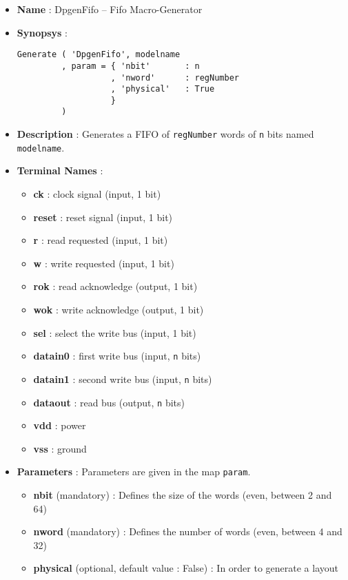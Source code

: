 \begin{itemize}
    \item \textbf{Name} : DpgenFifo -- Fifo Macro-Generator
    \item \textbf{Synopsys} :
\begin{verbatim}
Generate ( 'DpgenFifo', modelname
         , param = { 'nbit'       : n
                   , 'nword'      : regNumber
                   , 'physical'   : True                   
                   }
         )
\end{verbatim}
    \item \textbf{Description} : Generates a FIFO of \verb-regNumber- words of \verb-n- bits named \verb-modelname-.
    \item \textbf{Terminal Names} :
    \begin{itemize}
        \item \textbf{ck} : clock signal (input, 1 bit)
        \item \textbf{reset} : reset signal (input, 1 bit)
        \item \textbf{r} : read requested (input, 1 bit)
        \item \textbf{w} : write requested (input, 1 bit)
        \item \textbf{rok} : read acknowledge (output, 1 bit)
        \item \textbf{wok} : write acknowledge (output, 1 bit) 
        \item \textbf{sel} : select the write bus (input, 1 bit)
        \item \textbf{datain0} : first write bus (input, \verb-n- bits)
        \item \textbf{datain1} : second write bus (input, \verb-n- bits)
        \item \textbf{dataout} : read bus (output, \verb-n- bits)
        \item \textbf{vdd} : power
        \item \textbf{vss} : ground
    \end{itemize}
    \item \textbf{Parameters} : Parameters are given in the map \verb-param-.
    \begin{itemize}
        \item \textbf{nbit} (mandatory) : Defines the size of the words (even, between 2 and 64)
        \item \textbf{nword} (mandatory) : Defines the number of words (even, between 4 and 32)
        \item \textbf{physical} (optional, default value : False) : In order to generate a layout

\end{itemize}
\end{itemize}
